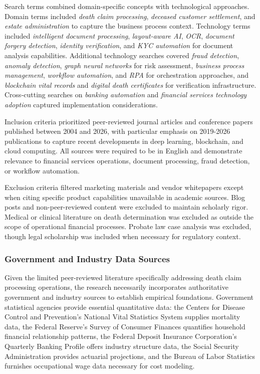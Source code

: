 Search terms combined domain-specific concepts with technological approaches. Domain terms included \textit{death claim processing}, \textit{deceased customer settlement}, and \textit{estate administration} to capture the business process context. Technology terms included \textit{intelligent document processing}, \textit{layout-aware AI}, \textit{OCR}, \textit{document forgery detection}, \textit{identity verification}, and \textit{KYC automation} for document analysis capabilities. Additional technology searches covered \textit{fraud detection}, \textit{anomaly detection}, \textit{graph neural networks} for risk assessment, \textit{business process management}, \textit{workflow automation}, and \textit{RPA} for orchestration approaches, and \textit{blockchain vital records} and \textit{digital death certificates} for verification infrastructure. Cross-cutting searches on \textit{banking automation} and \textit{financial services technology adoption} captured implementation considerations.

Inclusion criteria prioritized peer-reviewed journal articles and conference papers published between 2004 and 2026, with particular emphasis on 2019-2026 publications to capture recent developments in deep learning, blockchain, and cloud computing. All sources were required to be in English and demonstrate relevance to financial services operations, document processing, fraud detection, or workflow automation.

Exclusion criteria filtered marketing materials and vendor whitepapers except when citing specific product capabilities unavailable in academic sources. Blog posts and non-peer-reviewed content were excluded to maintain scholarly rigor. Medical or clinical literature on death determination was excluded as outside the scope of operational financial processes. Probate law case analysis was excluded, though legal scholarship was included when necessary for regulatory context.

\subsubsection{Government and Industry Data Sources}

Given the limited peer-reviewed literature specifically addressing death claim processing operations, the research necessarily incorporates authoritative government and industry sources to establish empirical foundations. Government statistical agencies provide essential quantitative data: the Centers for Disease Control and Prevention's National Vital Statistics System supplies mortality data, the Federal Reserve's Survey of Consumer Finances quantifies household financial relationship patterns, the Federal Deposit Insurance Corporation's Quarterly Banking Profile offers industry structure data, the Social Security Administration provides actuarial projections, and the Bureau of Labor Statistics furnishes occupational wage data necessary for cost modeling.

